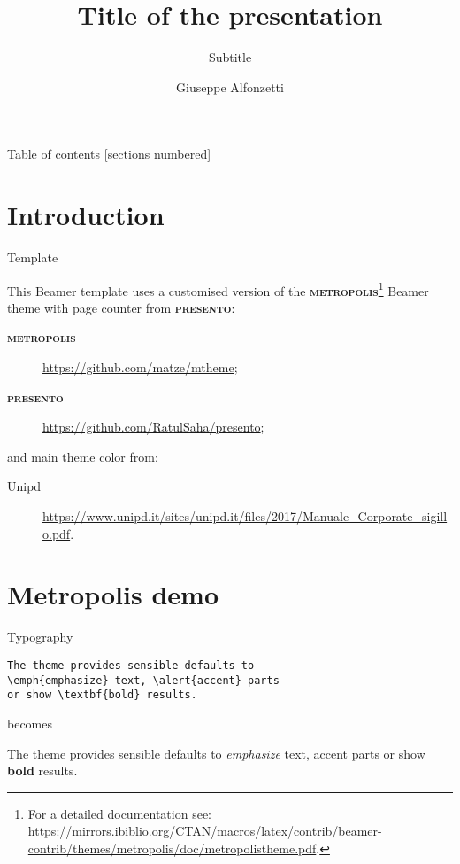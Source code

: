 \documentclass[aspectratio=169, 15pt]{beamer}
\title{Title of the presentation}
\subtitle{Subtitle}
\date{}
\author{Giuseppe Alfonzetti}
\institute{University of Padova}
\newcommand{\metro}{\textbf{\textsc{metropolis}}\xspace}
\newcommand{\pres}{\textbf{\textsc{presento}}\xspace}
\begin{document}
\maketitle
\begin{frame}{Table of contents}
\vspace{0.2cm}
\footnotesize
  [sections numbered]
  \tableofcontents
\end{frame}
\section{Introduction}
\begin{frame}[fragile]{Template}

This Beamer template uses a customised version of the \metro\footnote{For a detailed documentation see: \url{https://mirrors.ibiblio.org/CTAN/macros/latex/contrib/beamer-contrib/themes/metropolis/doc/metropolistheme.pdf}.} Beamer theme with page counter from \pres:

\begin{description}
\item[\alert{\metro}] \url{https://github.com/matze/mtheme};
\item[\alert{\pres}] \url{https://github.com/RatulSaha/presento};
\end{description}
and main theme color from:
\begin{description}
\item[\alert{Unipd}] \url{https://www.unipd.it/sites/unipd.it/files/2017/Manuale_Corporate_sigillo.pdf}.
\end{description}
\end{frame}
\section{Metropolis demo}

\begin{frame}[fragile]{Typography}
      \begin{verbatim}The theme provides sensible defaults to
\emph{emphasize} text, \alert{accent} parts
or show \textbf{bold} results.
\end{verbatim}

  \begin{center}becomes\end{center}

  The theme provides sensible defaults to \emph{emphasize} text,
  \alert{accent} parts or show \textbf{bold} results.
\end{frame}
\end{document}

